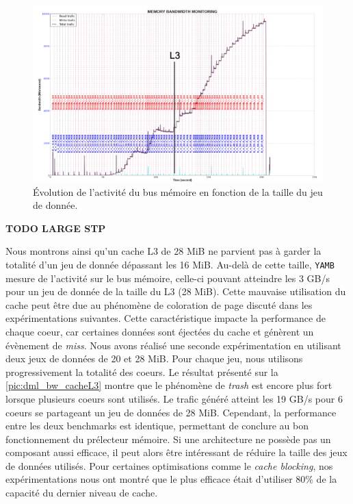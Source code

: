          \begin{figure}
        \center
        \includegraphics[width=14cm]{images/dml_L3_sharing.png}
        \caption{\label{pic:dml_L3_sharing} Évolution de l'activité du bus mémoire en fonction de la taille du jeu de donnée.}
        \end{figure}
        \textbf{TODO LARGE STP}
        
        Nous montrons ainsi qu'un cache L3 de 28 MiB ne parvient pas à garder la totalité d'un jeu de donnée dépassant les 16 MiB. Au-delà de cette taille, \verb=YAMB= mesure de l'activité sur le bus mémoire, celle-ci pouvant atteindre les 3 GB/s pour un jeu de donnée de la taille du L3 (28 MiB). Cette mauvaise utilisation du cache peut être due au phénomène de coloration de page discuté dans les expérimentations suivantes. Cette caractéristique impacte la performance de chaque coeur, car certaines données sont éjectées du cache et génèrent un évènement de \textit{miss}. Nous avons réalisé une seconde expérimentation en utilisant deux jeux de données de 20 et 28 MiB. Pour chaque jeu, nous utilisons progressivement la totalité des coeurs. Le résultat présenté sur la \autoref{pic:dml_bw_cacheL3} montre que le phénomène de \textit{trash} est encore plus fort lorsque plusieurs coeurs sont utilisés. Le trafic généré atteint les 19 GB/s pour 6 coeurs se partageant un jeu de données de 28 MiB. Cependant, la performance entre les deux benchmarks est identique, permettant de conclure au bon fonctionnement du prélecteur mémoire. Si une architecture ne possède pas un composant aussi efficace, il peut alors être intéressant de réduire la taille des jeux de données utilisés. Pour certaines optimisations comme le \textit{cache blocking}, nos expérimentations nous ont montré que le plus efficace était d'utiliser 80\% de la capacité du dernier niveau de cache.
        

